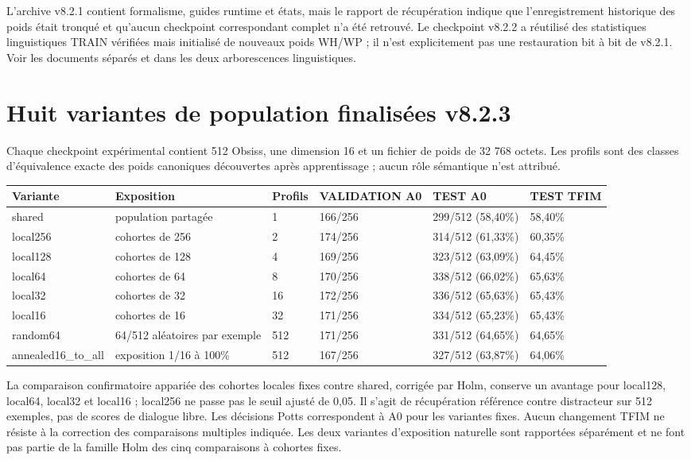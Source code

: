 \documentclass[11pt,a4paper]{report}
\newcommand{\code}[1]{\texttt{\detokenize{#1}}}
\begin{document}
L’archive v8.2.1 contient formalisme, guides runtime et états, mais le rapport de récupération indique que l’enregistrement historique des poids était tronqué et qu’aucun checkpoint correspondant complet n’a été retrouvé. Le checkpoint v8.2.2 a réutilisé des statistiques linguistiques TRAIN vérifiées mais initialisé de nouveaux poids WH/WP ; il n’est explicitement pas une restauration bit à bit de v8.2.1. Voir les documents séparés \code{models/eSonde_v8_2_0/} et \code{models/eSonde_v8_2_1/} dans les deux arborescences linguistiques.

\section{Huit variantes de population finalisées v8.2.3}
Chaque checkpoint expérimental contient 512 Obsiss, une dimension 16 et un fichier de poids de 32 768 octets. Les profils sont des classes d’équivalence exacte des poids canoniques découvertes après apprentissage ; aucun rôle sémantique n’est attribué.
\begin{longtable}{p{2.8cm}p{3.0cm}p{1.9cm}p{1.9cm}p{1.9cm}p{1.7cm}}
\toprule
Variante & Exposition & Profils & VALIDATION A0 & TEST A0 & TEST TFIM\\
\midrule
shared & population partagée & 1 & 166/256 & 299/512 (58,40\%) & 58,40\%\\
local256 & cohortes de 256 & 2 & 174/256 & 314/512 (61,33\%) & 60,35\%\\
local128 & cohortes de 128 & 4 & 169/256 & 323/512 (63,09\%) & 64,45\%\\
local64 & cohortes de 64 & 8 & 170/256 & 338/512 (66,02\%) & 65,63\%\\
local32 & cohortes de 32 & 16 & 172/256 & 336/512 (65,63\%) & 65,43\%\\
local16 & cohortes de 16 & 32 & 171/256 & 334/512 (65,23\%) & 65,43\%\\
random64 & 64/512 aléatoires par exemple & 512 & 171/256 & 331/512 (64,65\%) & 64,65\%\\
annealed16\_to\_all & exposition 1/16 à 100\% & 512 & 167/256 & 327/512 (63,87\%) & 64,06\%\\
\bottomrule
\end{longtable}

La comparaison confirmatoire appariée des cohortes locales fixes contre shared, corrigée par Holm, conserve un avantage pour local128, local64, local32 et local16 ; local256 ne passe pas le seuil ajusté de 0,05. Il s’agit de récupération référence contre distracteur sur 512 exemples, pas de scores de dialogue libre. Les décisions Potts correspondent à A0 pour les variantes fixes. Aucun changement TFIM ne résiste à la correction des comparaisons multiples indiquée. Les deux variantes d’exposition naturelle sont rapportées séparément et ne font pas partie de la famille Holm des cinq comparaisons à cohortes fixes.
\end{document}
